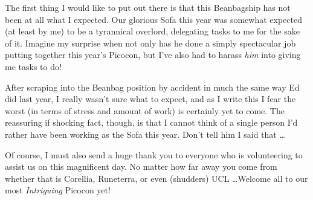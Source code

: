 The first thing I would like to put out there is that this Beanbagship
has not been at all what I expected. Our glorious Sofa this year was
somewhat expected (at least by me) to be a tyrannical overlord,
delegating tasks to me for the sake of it. Imagine my surprise when
not only has he done a simply spectacular job putting together this
year's Picocon, but I've also had to harass \emph{him} into giving me
tasks to do!

After scraping into the Beanbag position by accident in much the same
way Ed did last year, I really wasn't sure what to expect, and as I
write this I fear the worst (in terms of stress and amount of work) is
certainly yet to come. The reassuring \textemdash{} if
shocking \textemdash{} fact, though, is that I cannot think of a
single person I'd rather have been working as the Sofa this
year. Don't tell him I said that \ldots

Of course, I must also send a huge thank you to everyone who is
volunteering to assist us on this magnificent day. No matter how far
away you come from \textemdash{} whether that is Corellia, Runeterra,
or even (shudders) UCL \ldots Welcome all to our
most \emph{Intriguing} Picocon yet!
